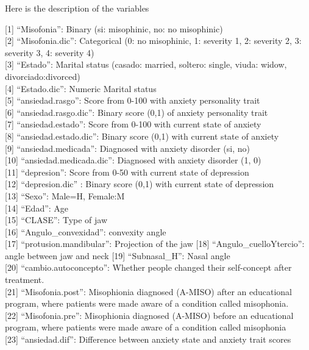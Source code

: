 \documentclass[
]{book}
\begin{document}
Here is the description of the variables

{[}1{]} ``Misofonia'': Binary (si: misophinic, no: no misophinic)\\
{[}2{]} ``Misofonia.dic'': Categorical (0: no misophinic, 1: severity 1, 2: severity 2, 3: severity 3, 4: severity 4)\\
{[}3{]} ``Estado'': Marital status (casado: married, soltero: single, viuda: widow, divorciado:divorced)\\
{[}4{]} ``Estado.dic'': Numeric Marital status\\
{[}5{]} ``ansiedad.rasgo'': Score from 0-100 with anxiety personality trait\\
{[}6{]} ``ansiedad.rasgo.dic'': Binary score (0,1) of anxiety personality trait\\
{[}7{]} ``ansiedad.estado'': Score from 0-100 with current state of anxiety\\
{[}8{]} ``ansiedad.estado.dic'': Binary score (0,1) with current state of anxiety\\
{[}9{]} ``ansiedad.medicada'': Diagnosed with anxiety disorder (si, no)\\
{[}10{]} ``ansiedad.medicada.dic'': Diagnosed with anxiety disorder (1, 0)\\
{[}11{]} ``depresion'': Score from 0-50 with current state of depression\\
{[}12{]} ``depresion.dic'' : Binary score (0,1) with current state of depression\\
{[}13{]} ``Sexo'': Male=H, Female:M\\
{[}14{]} ``Edad'': Age\\
{[}15{]} ``CLASE'': Type of jaw\\
{[}16{]} ``Angulo\_convexidad'': convexity angle\\
{[}17{]} ``protusion.mandibular'': Projection of the jaw
{[}18{]} ``Angulo\_cuelloYtercio'': angle between jaw and neck
{[}19{]} ``Subnasal\_H'': Nasal angle\\
{[}20{]} ``cambio.autoconcepto'': Whether people changed their self-concept after treatment.\\
{[}21{]} ``Misofonia.post'': Misophionia diagnosed (A-MISO) after an educational program, where patients were made aware of a condition called misophonia.\\
{[}22{]} ``Misofonia.pre'': Misophionia diagnosed (A-MISO) before an educational program, where patients were made aware of a condition called misophonia\\
{[}23{]} ``ansiedad.dif'': Difference between anxiety state and anxiety trait scores
\end{document}
